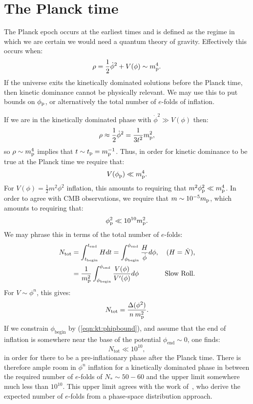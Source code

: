 \section{The Planck time}
The Planck epoch occurs at the earliest times and is defined as the
regime in which we are certain we would need a quantum theory of
gravity. Effectively this occurs when:
\begin{equation}
  \rho = \frac{1}{2}\dot\phi^2 + V(\phi)  \sim m_{\mathrm{p}}^4.
  \label{eqn:kt:rhosim}
\end{equation}
If the universe exits the kinetically dominated solutions before the
Planck time, then kinetic dominance cannot be physically relevant. We
may use this to put bounds on \(\phi_{\mathrm{p}}\), or alternatively the total
number of \(e\)-folds of inflation.

If we are in the kinetically dominated phase with \(\dot{\phi}^2\gg
V(\phi)\) then:
\begin{equation}
  \rho \approx \frac{1}{2}\dot\phi^2= \frac{1}{3t^2}m_{\mathrm{p}}^2 ,
  \label{eqn:kt:rhop}
\end{equation}
so \(\rho\sim m_{\mathrm{p}}^4\) implies that \(t\sim t_{\mathrm{p}}=m_{\mathrm{p}}^{-1}\). Thus, in order for
kinetic dominance to be true at the Planck time we require that:
\begin{equation}
  V(\phi_{\mathrm{p}}) \ll m_{\mathrm{p}}^4.
\end{equation}
For \(V(\phi) = \frac{1}{2}m^2\phi^2\) inflation, this amounts to requiring that \(m^2\phi_{\mathrm{p}}^2\ll m_{\mathrm{p}}^4\). In order to agree with CMB observations, we require
that \(m\sim10^{-5}m_{\mathrm{p}}\), which amounts to requiring that:
\begin{equation}
 \phi_{\mathrm{p}}^2 \ll 10^{10}m_{\mathrm{p}}^2.
 \label{eqn:kt:phipbound}
\end{equation}
We may phrase this in terms of the total number of \(e\)-folds:
\begin{align}
  N_\mathrm{tot} 
  &=\int_{t_\mathrm{begin}}^{t_\mathrm{end}} H dt 
  =\int_{\phi_\mathrm{begin}}^{\phi_\mathrm{end}} 
       \frac{H}{\dot{\phi}}d\phi,  &\text{(\(H=\dot{N}\)),}
  \\
  &=\frac{1}{m_{\mathrm{p}}^2}\int_{\phi_\mathrm{begin}}^{\phi_\mathrm{end}}
     {\frac{V(\phi)}{V^\prime(\phi)}}d\phi &\text{Slow Roll.}
\end{align}
For \(V\sim\phi^n\), this gives:
\begin{equation}
  N_\mathrm{tot} = \frac{\Delta (\phi^2) }{n\:m_{\mathrm{p}}^2}.
\end{equation}
If we constrain \(\phi_\mathrm{begin}\) by (\ref{eqn:kt:phipbound}), and assume that the end of inflation  is somewhere near the base of the potential \(\phi_\mathrm{end}\sim0\), one finds: 
\begin{equation}
  N_\mathrm{tot}\ll 10^{10},
\end{equation}
in order for there to be a pre-inflationary phase after the Planck time.
There is therefore ample room in $\phi^n$ inflation for a kinetically dominated phase in between the required number of \(e\)-folds of \(N_*\sim50-60\) and the upper limit somewhere much less than $10^{10}$. This upper limit agrees with the work of~\cite{how_many_e_folds}, who derive the expected number of \(e\)-folds from a phase-space distribution approach.

